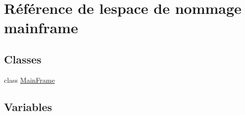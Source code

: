\hypertarget{namespacemainframe}{}\section{Référence de l\textquotesingle{}espace de nommage mainframe}
\label{namespacemainframe}
\subsection*{Classes}
\begin{DoxyCompactItemize}
\item 
class \hyperlink{classmainframe_1_1_main_frame}{Main\+Frame}
\end{DoxyCompactItemize}
\subsection*{Variables}
